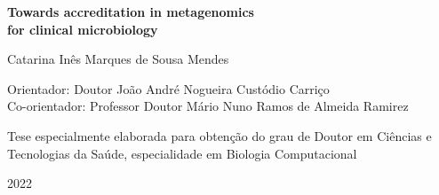 \begin{titlepage}
\begin{center}
        \vspace{1cm}

        \huge
        \textbf{Towards accreditation in metagenomics \\[1ex] for clinical microbiology}
        \normalsize
        
        \vspace{1cm}
        
        \large
        Catarina Inês Marques de Sousa Mendes
        \normalsize
        
        \vspace{1cm}
        
        Orientador: Doutor João André Nogueira Custódio Carriço\\
        Co-orientador: Professor Doutor Mário Nuno Ramos de Almeida Ramirez
        
        \vfill
        
        Tese especialmente elaborada para obtenção do grau de Doutor em Ciências e Tecnologias da Saúde, especialidade em Biologia Computacional\\
        
        \vspace{0.8cm}
        
        2022
        
    \end{center}
\end{titlepage}